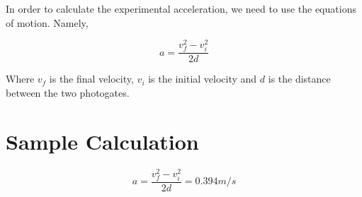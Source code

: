 
	{In order to calculate the experimental acceleration, we need to use the equations of motion. Namely,}

		$$a = \frac{v^{2}_{f} - v^{2}_{i}}{2d}$$

	{Where $v_{f}$ is the final velocity, $v_{i}$ is the initial velocity and $d$ is the distance between the two photogates.}

\section{{Sample Calculation}}

		$$a = \frac{v^{2}_{f} - v^{2}_{i}}{2d} = 0.394 m/s$$


